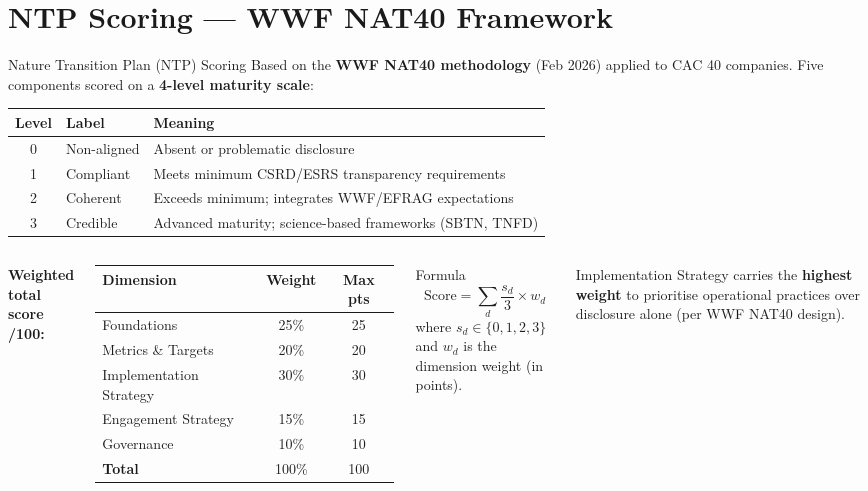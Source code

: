 \documentclass[aspectratio=169]{beamer}
\begin{document}
\section{NTP Scoring --- WWF NAT40 Framework}

\begin{frame}{Nature Transition Plan (NTP) Scoring}
  \scriptsize
  Based on the \textbf{WWF NAT40 methodology} (Feb 2026) applied to CAC 40 companies.
  Five components scored on a \textbf{4-level maturity scale}:

  \vspace{6pt}
  \begin{tabularx}{\textwidth}{c l X}
    \toprule
    \textbf{Level} & \textbf{Label} & \textbf{Meaning} \\
    \midrule
    0 & Non-aligned  & Absent or problematic disclosure \\
    1 & Compliant    & Meets minimum CSRD/ESRS transparency requirements \\
    2 & Coherent     & Exceeds minimum; integrates WWF/EFRAG expectations \\
    3 & Credible     & Advanced maturity; science-based frameworks (SBTN, TNFD) \\
    \bottomrule
  \end{tabularx}

  \vspace{8pt}
  \begin{columns}
      \textbf{Weighted total score /100:}\\[4pt]
      \begin{tabularx}{\columnwidth}{l c c}
        \toprule
        Dimension & Weight & Max pts \\
        \midrule
        Foundations             & 25\% & 25 \\
        Metrics \& Targets      & 20\% & 20 \\
        Implementation Strategy & 30\% & 30 \\
        Engagement Strategy     & 15\% & 15 \\
        Governance              & 10\% & 10 \\
        \midrule
        \textbf{Total}          & 100\% & 100 \\
        \bottomrule
      \end{tabularx}
      \begin{block}{Formula}
        \[
          \text{Score} = \sum_{d} \frac{s_d}{3} \times w_d
        \]
        where $s_d \in \{0,1,2,3\}$ and $w_d$ is the dimension weight (in points).
      \end{block}
      \vspace{4pt}
      \footnotesize Implementation Strategy carries the \textbf{highest weight} to
      prioritise operational practices over disclosure alone (per WWF NAT40 design).
  \end{columns}
\end{frame}
\end{document}
